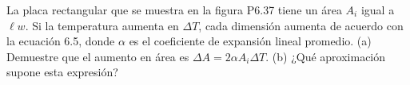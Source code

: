 \item La placa rectangular que se muestra en la figura P6.37 tiene un área $A_i$ igual a $\ell w$. Si la temperatura aumenta en $\Delta T$, cada dimensión aumenta de acuerdo con la ecuación 6.5, donde $\alpha$ es el coeficiente de expansión lineal promedio. (a) Demuestre que el aumento en área es $\Delta A = 2\alpha A_i \Delta T$. (b) ¿Qué aproximación supone esta expresión?
